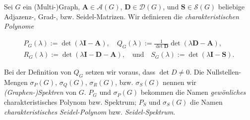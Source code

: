 \begin{definition}
    Sei $G$ ein (Multi-)Graph, $\mathbf A \in \mathcal A(G)$, $\mathbf D \in \mathcal D(G)$, und $\mathbf S \in \mathcal S(G)$ beliebige Adjazenz-, Grad-, bzw. Seidel-Matrizen.
    Wir definieren die \textit{charakteristischen Polynome}

    \begin{gather*}
        P_G(\lambda) := \det(\lambda \mathbf I - \mathbf A),
        \quad
        Q_G(\lambda) := \frac{1}{\det \mathbf D} \det(\lambda \mathbf D - \mathbf A), \\
        R_G(\lambda) := \det(\lambda \mathbf I - \mathbf D - \mathbf A),
        \quad
        \text{und}
        \quad
        S_G(\lambda) := \det(\lambda \mathbf I - \mathbf S).
    \end{gather*}

    Bei der Definition von $Q_G$ setzen wir voraus, dass $\det D \neq 0$.
    Die Nullstellen-Mengen $\sigma_P(G)$, $\sigma_Q(G)$, $\sigma_R(G)$, bzw. $\sigma_S(G)$ nennen wir \textit{(Graphen-)Spektren} von $G$.
    $P_G$ und $\sigma_P(G)$ bekommen die Namen \textit{gewönliches} charakteristisches Polynom bzw. Spektrum;
    $P_S$ und $\sigma_S(G)$ die Namen \textit{charakteristisches Seidel-Polynom} bzw. \textit{Seidel-Spektrum}.

\end{definition}
